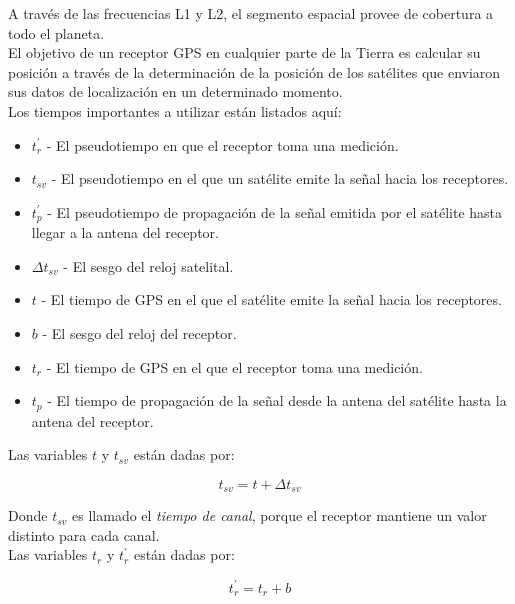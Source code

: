 A través de las frecuencias L1 y L2, el segmento espacial provee de cobertura a todo el planeta.\\

El objetivo de un receptor GPS en cualquier parte de la Tierra es calcular su posición a través de la determinación de la posición de los satélites que enviaron sus datos de localización en un determinado momento.\\

Los tiempos importantes a utilizar están listados aquí:

\begin{itemize}
\item $t^{'}_r$ - El pseudotiempo en que el receptor toma una medición.\\
\item $t_{sv}$ - El pseudotiempo en el que un satélite emite la señal hacia los receptores.\\
\item $t^{'}_p$ - El pseudotiempo de propagación de la señal emitida por el satélite hasta llegar a la antena del receptor.\\
\item $\Delta t_{sv}$ - El sesgo del reloj satelital.\\
\item $t$ - El tiempo de GPS en el que el satélite emite la señal hacia los receptores.\\
\item $b$ - El sesgo del reloj del receptor.\\
\item $t_r$ - El tiempo de GPS en el que el receptor toma una medición.\\
\item $t_p$ - El tiempo de propagación de la señal desde la antena del satélite hasta la antena del receptor.
\end{itemize}

Las variables $t$ y $t_{sv}$ están dadas por: 

\begin{equation}
\label{Eq:tsv}
t_{sv} = t + \Delta t_{sv}
\end{equation}

Donde $t_{sv}$ es llamado el \textit{tiempo de canal}, porque el receptor mantiene un valor distinto para cada canal.\\

Las variables $t_r$ y $t^{'}_r$ están dadas por:

\begin{equation}
\label{Eq:t_r}
t^{'}_r = t_r + b
\end{equation}

